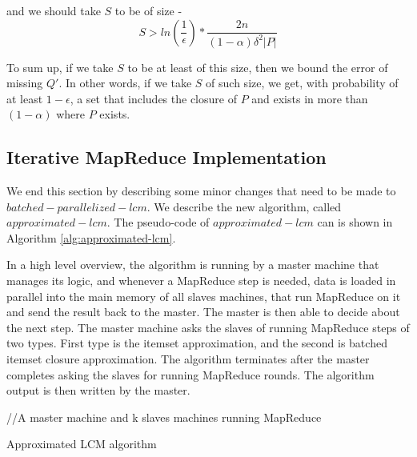 and we should take $S$ to be of size - 
\begin{equation}
S >
ln(\frac{1}{\epsilon})*\frac{2n}{(1-\alpha)\delta^2\left\vert{P}\right\vert}
\end{equation}

To sum up, if we take $S$ to be at least of this size, then
we bound the error of missing $Q'$. In other words, if we
take $S$ of such size, we get, with probability of at least
$1-\epsilon$, a set that includes the closure of $P$ and
exists in more than $(1-\alpha)$ where $P$ exists.

\subsection{Iterative MapReduce Implementation}
We end this section by describing some minor changes that
need to be made to $batched-parallelized-lcm$.
We describe the new algorithm, called $approximated-lcm$.
The pseudo-code of $approximated-lcm$ can is shown in
Algorithm \ref{alg:approximated-lcm}.

In a high level overview, the algorithm is running by a
master machine that manages its logic, and whenever a
MapReduce step is needed, data is loaded in parallel into
the main memory of all slaves machines, that run MapReduce
on it and send the result back to the master. The master is
then able to decide about the next step. The master
machine asks the slaves of running MapReduce steps of two
types. First type is the itemset approximation, and the
second is batched itemset closure approximation. The
algorithm terminates after the master completes asking the 
slaves for running MapReduce rounds. The algorithm output 
is then written by the master.

\begin{algorithm}[t]
 \DontPrintSemicolon
 //A master machine and k slaves machines running
 MapReduce\;
 \;
 \caption{Approximated LCM algorithm}
 \label{alg:approximated-lcm}
\end{algorithm}

